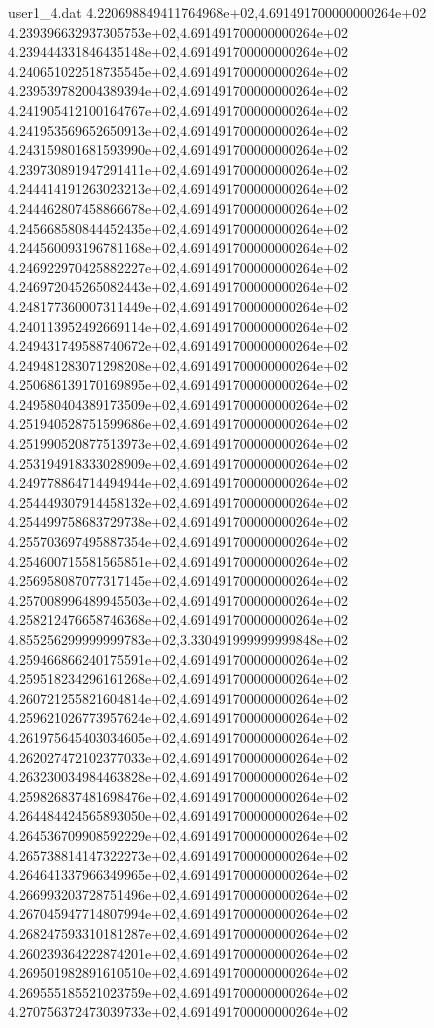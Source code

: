 \begin{filecontents}{user1_4.dat}
4.220698849411764968e+02,4.691491700000000264e+02
4.239396632937305753e+02,4.691491700000000264e+02
4.239444331846435148e+02,4.691491700000000264e+02
4.240651022518735545e+02,4.691491700000000264e+02
4.239539782004389394e+02,4.691491700000000264e+02
4.241905412100164767e+02,4.691491700000000264e+02
4.241953569652650913e+02,4.691491700000000264e+02
4.243159801681593990e+02,4.691491700000000264e+02
4.239730891947291411e+02,4.691491700000000264e+02
4.244414191263023213e+02,4.691491700000000264e+02
4.244462807458866678e+02,4.691491700000000264e+02
4.245668580844452435e+02,4.691491700000000264e+02
4.244560093196781168e+02,4.691491700000000264e+02
4.246922970425882227e+02,4.691491700000000264e+02
4.246972045265082443e+02,4.691491700000000264e+02
4.248177360007311449e+02,4.691491700000000264e+02
4.240113952492669114e+02,4.691491700000000264e+02
4.249431749588740672e+02,4.691491700000000264e+02
4.249481283071298208e+02,4.691491700000000264e+02
4.250686139170169895e+02,4.691491700000000264e+02
4.249580404389173509e+02,4.691491700000000264e+02
4.251940528751599686e+02,4.691491700000000264e+02
4.251990520877513973e+02,4.691491700000000264e+02
4.253194918333028909e+02,4.691491700000000264e+02
4.249778864714494944e+02,4.691491700000000264e+02
4.254449307914458132e+02,4.691491700000000264e+02
4.254499758683729738e+02,4.691491700000000264e+02
4.255703697495887354e+02,4.691491700000000264e+02
4.254600715581565851e+02,4.691491700000000264e+02
4.256958087077317145e+02,4.691491700000000264e+02
4.257008996489945503e+02,4.691491700000000264e+02
4.258212476658746368e+02,4.691491700000000264e+02
4.855256299999999783e+02,3.330491999999999848e+02
4.259466866240175591e+02,4.691491700000000264e+02
4.259518234296161268e+02,4.691491700000000264e+02
4.260721255821604814e+02,4.691491700000000264e+02
4.259621026773957624e+02,4.691491700000000264e+02
4.261975645403034605e+02,4.691491700000000264e+02
4.262027472102377033e+02,4.691491700000000264e+02
4.263230034984463828e+02,4.691491700000000264e+02
4.259826837481698476e+02,4.691491700000000264e+02
4.264484424565893050e+02,4.691491700000000264e+02
4.264536709908592229e+02,4.691491700000000264e+02
4.265738814147322273e+02,4.691491700000000264e+02
4.264641337966349965e+02,4.691491700000000264e+02
4.266993203728751496e+02,4.691491700000000264e+02
4.267045947714807994e+02,4.691491700000000264e+02
4.268247593310181287e+02,4.691491700000000264e+02
4.260239364222874201e+02,4.691491700000000264e+02
4.269501982891610510e+02,4.691491700000000264e+02
4.269555185521023759e+02,4.691491700000000264e+02
4.270756372473039733e+02,4.691491700000000264e+02

\end{filecontents}
